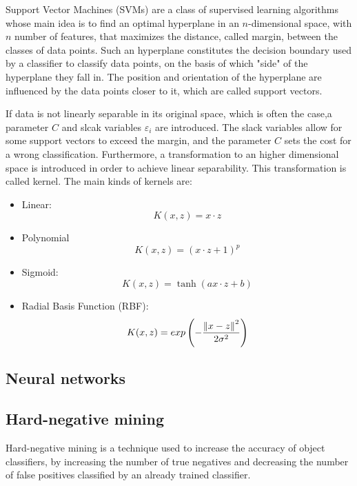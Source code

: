 \documentclass[journal,twocolumn]{IEEEtran}
\begin{document}
Support Vector Machines (SVMs) are a class of supervised learning algorithms whose main idea is to find an optimal hyperplane in an $n$-dimensional space, with $n$ number of features, that maximizes the distance, called margin, between the classes of data points. Such an hyperplane constitutes the decision boundary used by a classifier to classify data points, on the basis of which "side" of the hyperplane they fall in. The position and orientation of the hyperplane are influenced by the data points closer to it, which are called support vectors.

If data is not linearly separable in its original space, which is often the case,a parameter $C$ and slcak variables $\varepsilon_i$ are introduced. The slack variables allow for some support vectors to exceed the margin, and the parameter $C$ sets the cost for a wrong classification. Furthermore, a transformation to an higher dimensional space is introduced in order to achieve linear separability. This transformation is called kernel.
The main kinds of kernels are:
\begin{itemize}
\item Linear:
\begin{equation*}
K(x,z) = x\cdot z
\end{equation*}
\item Polynomial 
\begin{equation*}
K(x,z)=(x\cdot z + 1)^p
\end{equation*}
\item Sigmoid:
\begin{equation*}
K(x,z)=\tanh(ax\cdot z+b)
\end{equation*}
\item Radial Basis Function (RBF):
\begin{equation*}
K(x,z)=exp\left(-\frac{\norm{x-z}^2}{2\sigma^2}\right)
\end{equation*}
\end{itemize}

\subsection{Neural networks}

\subsection{Hard-negative mining}

Hard-negative mining is a technique used to increase the accuracy of object classifiers, by increasing the number of true negatives and decreasing the number of false positives classified by an already trained classifier.
\end{document}
